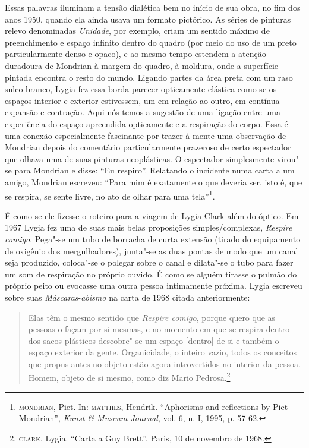 \begin{multicols}{2}
Essas palavras iluminam a tensão dialética bem no início de sua obra, no
fim dos anos 1950, quando ela ainda usava um formato pictórico. As
séries de pinturas relevo denominadas \textit{Unidade}, por exemplo, criam
um sentido máximo de preenchimento e espaço infinito dentro do quadro
(por meio do uso de um preto particularmente denso e opaco), e ao mesmo
tempo estendem a atenção duradoura de Mondrian à margem do quadro, à
moldura, onde a superfície pintada encontra o resto do mundo. Ligando
partes da área preta com um raso sulco branco, Lygia fez essa borda
parecer opticamente elástica como se os espaços interior e exterior
estivessem, um em relação ao outro, em contínua expansão e contração.
Aqui nós temos a sugestão de uma ligação entre uma experiência do espaço
apreendida opticamente e a respiração do corpo. Essa é uma conexão
especialmente fascinante por trazer à mente uma observação de Mondrian
depois do comentário particularmente prazeroso de certo espectador que
olhava uma de suas pinturas neoplásticas. O espectador simplesmente
virou"-se para Mondrian e disse: ``Eu respiro''. Relatando o incidente numa
carta a um amigo, Mondrian escreveu: ``Para mim é exatamente o que
deveria ser, isto é, que se respira, se sente livre, no ato de olhar
para uma tela''\footnote{\textsc{mondrian}, Piet. In: \textsc{matthes}, Hendrik. ``Aphorisms
  and reflections by Piet Mondrian'', \textit{Kunst \& Museum Journal},
  vol. 6, n. I, 1995, p. 57-62.}.

É como se ele fizesse o roteiro para a viagem de Lygia Clark além do
óptico. Em 1967 Lygia fez uma de suas mais belas proposições
simples/complexas, \textit{Respire comigo}. Pega"-se um tubo de borracha de
curta extensão (tirado do equipamento de oxigênio dos mergulhadores),
junta"-se as duas pontas de modo que um canal seja produzido, coloca"-se o
polegar sobre o canal e dilata"-se o tubo para fazer um som de respiração
no próprio ouvido. É como se alguém tirasse o pulmão do próprio peito ou
evocasse uma outra pessoa intimamente próxima. Lygia escreveu sobre suas
\textit{Máscaras}-\textit{abismo} na carta de 1968 citada anteriormente:

\begin{quote}
Elas têm o mesmo sentido que \textit{Respire comigo}, porque quero que as
pessoas o façam por si mesmas, e no momento em que se respira dentro dos
sacos plásticos descobre"-se um espaço {[}dentro{]} de si e também o
espaço exterior da gente. Organicidade, o inteiro vazio, todos os
conceitos que propus antes no objeto estão agora introvertidos no
interior da pessoa. Homem, objeto de si mesmo, como diz Mario
Pedrosa.\footnote{\textsc{clark}, Lygia. ``Carta a Guy Brett''. Paris, 10 de
  novembro de 1968.}
\end{quote}


\end{multicols}
